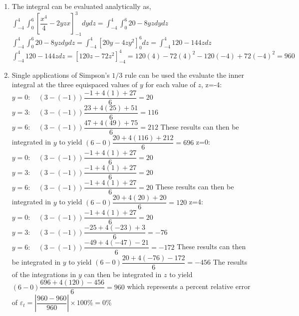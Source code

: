 \documentclass[../main.tex]{subfiles}
\begin{document}
\section{}
\begin{enumerate}[label=\bfseries(\alph*)]
\item The integral can be evaluated analytically as,
	\bigbreak
$\displaystyle\int_{-4}^{4} \int_{0}^{6}\left[\dfrac{x^{4}}{4}-2 y z x\right]_{-1}^{3} d y d z=\int_{-4}^{4} \int_{0}^{6} 20-8 y z d y d z$
	\bigbreak
$\displaystyle\int_{-4}^{4} \int_{0}^{6} 20-8 y z d y d z=\int_{-4}^{4}\left[20 y-4 z y^{2}\right]_{0}^{6} d z=\int_{-4}^{4} 120-144 z d z$
	\bigbreak
$\displaystyle\int_{-4}^{4} 120-144 z d z=\left[120 z-72 z^{2}\right]_{-4}^{4}=120(4)-72(4)^{2}-120(-4)+72(-4)^{2}=960$
	\bigbreak
\item Single applications of Simpson's $1 / 3$ rule can be used the evaluate the inner integral at the three equispaced values of $y$ for each value of $z$,
	\bigbreak
z=-4:
	\bigbreak
$y=0: \quad(3-(-1)) \dfrac{-1+4(1)+27}{6}=20$
	\bigbreak
$y=3: \quad(3-(-1)) \dfrac{23+4(25)+51}{6}=116$
	\bigbreak
$y=6: \quad(3-(-1)) \dfrac{47+4(49)+75}{6}=212$
	\bigbreak
These results can then be integrated in $y$ to yield
	\bigbreak
$(6-0) \dfrac{20+4(116)+212}{6}=696$
	\bigbreak
z=0:
	\bigbreak
$y=0: \quad(3-(-1)) \dfrac{-1+4(1)+27}{6}=20$
	\bigbreak
$y=3: \quad(3-(-1)) \dfrac{-1+4(1)+27}{6}=20$
	\bigbreak
$y=6: \quad(3-(-1)) \dfrac{-1+4(1)+27}{6}=20$
	\bigbreak
These results can then be integrated in $y$ to yield
	\bigbreak
$(6-0) \dfrac{20+4(20)+20}{6}=120$
	\bigbreak
z=4:
	\bigbreak
$y=0: \quad(3-(-1)) \dfrac{-1+4(1)+27}{6}=20$
	\bigbreak
$y=3: \quad(3-(-1)) \dfrac{-25+4(-23)+3}{6}=-76$
	\bigbreak
$y=6: \quad(3-(-1)) \dfrac{-49+4(-47)-21}{6}=-172$
	\bigbreak
These results can then be integrated in $y$ to yield
	\bigbreak
$(6-0) \dfrac{20+4(-76)-172}{6}=-456$
	\bigbreak
The results of the integrations in $y$ can then be integrated in $z$ to yield
	\bigbreak
$(6-0) \dfrac{696+4(120)-456}{6}=960$
	\bigbreak
which represents a percent relative error of
	\bigbreak
$\varepsilon_{t}=\left|\dfrac{960-960}{960}\right| \times 100 \%=0 \%$
\end{enumerate}
\end{document}
